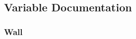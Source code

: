\subsection{Variable Documentation}
\subsubsection[{\texorpdfstring{Wall}{Wall}}]{\setlength{\rightskip}{0pt plus 5cm}Wall}\hypertarget{CMakeLists_8txt_ad4f6886266572e51d198a61a6c762ce5}{}\label{CMakeLists_8txt_ad4f6886266572e51d198a61a6c762ce5}
